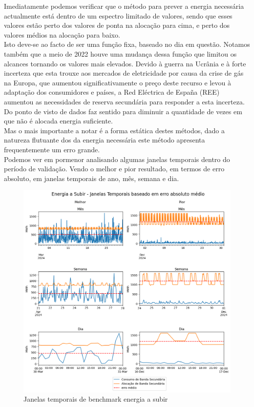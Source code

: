 Imediatamente podemos verificar que o método para prever a energia necessária actualmente está dentro de um espectro limitado de valores, sendo que esses valores estão perto dos valores de ponta na alocação para cima, e perto dos valores médios na alocação para baixo.\\
Isto deve-se ao facto de ser uma função fixa, baseado no dia em questão. Notamos também que a meio de 2022 houve uma mudança dessa função que limitou os alcances tornando os valores mais elevados. Devido à guerra na Ucrânia e à forte incerteza que esta trouxe aos mercados de eletricidade por causa da crise de gás na Europa, que aumentou significativamente o preço deste recurso e levou à adaptação dos consumidores e países, a Red Eléctrica de España (REE) aumentou as necessidades de reserva secundária para responder a esta incerteza.\\
Do ponto de visto de dados faz sentido para diminuir a quantidade  de vezes em que não é alocada energia suficiente.\\
Mas o mais importante a notar é a forma estática destes métodos, dado a natureza flutuante dos da energia necessária este método apresenta frequentemente um erro grande.\\
Podemos ver em pormenor analisando algumas janelas temporais dentro do período de validação. Vendo o melhor e pior resultado, em termos de erro absoluto, em janelas temporais de ano, mês, semana e dia.\\


\begin{figure}[H]
    \centering
    \includegraphics[width=\textwidth]{plots/alocacoes_temporais_upward_dataset.png}
    \caption{Janelas temporais de benchmark energia a subir}
    \label{fig:benchmarktimewindowsup}
\end{figure}


